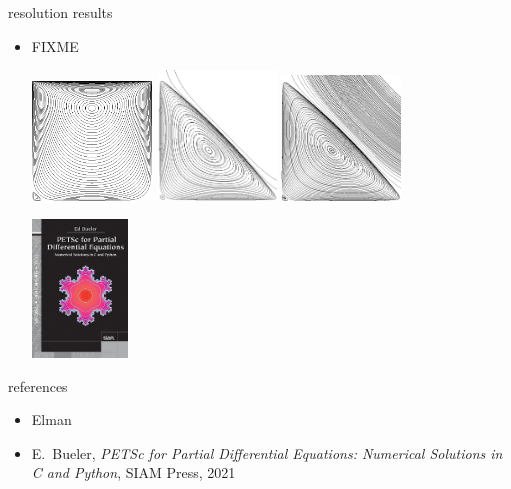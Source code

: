 \documentclass[10pt,hyperref,dvipsnames]{beamer}
\begin{document}
\begin{frame}{resolution results}

\begin{itemize}
\item FIXME
\begin{center}
\includegraphics[width=0.25\textwidth]{figs/eddies1.png} \qquad \includegraphics[width=0.25\textwidth]{figs/eddies2.png} \qquad \includegraphics[width=0.25\textwidth]{figs/eddies3.png}
\end{center}

\hfill \includegraphics[width=0.2\textwidth]{figs/frontcover.jpg}
\end{itemize}
\end{frame}



\begin{frame}{references}
\begin{itemize}
\item Elman
\item E.~Bueler, \emph{PETSc for Partial Differential Equations: Numerical Solutions in C and Python}, SIAM Press, 2021
\end{itemize}
\end{frame}
\end{document}
